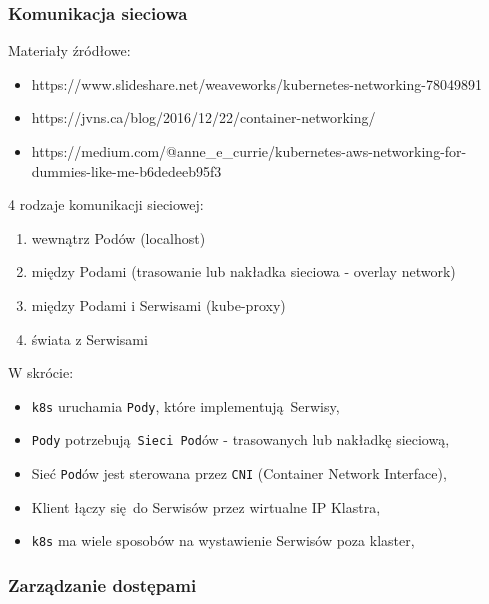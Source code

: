 \documentclass[a4paper,12pt,twoside,openany]{report}
\providecommand{\tightlist}{%
  \setlength{\itemsep}{0pt}\setlength{\parskip}{0pt}}
\newcommand{\passthrough}[1]{#1}
\begin{document}
\hypertarget{komunikacja-sieciowa}{%
\subsubsection{Komunikacja sieciowa}\label{komunikacja-sieciowa}}

Materiały źródłowe:

\begin{itemize}
\tightlist
\item
  https://www.slideshare.net/weaveworks/kubernetes-networking-78049891
\item
  https://jvns.ca/blog/2016/12/22/container-networking/
\item
  https://medium.com/@anne\_e\_currie/kubernetes-aws-networking-for-dummies-like-me-b6dedeeb95f3
\end{itemize}

4 rodzaje komunikacji sieciowej:

\begin{enumerate}
\def\labelenumi{\arabic{enumi}.}
\tightlist
\item
  wewnątrz Podów (localhost)
\item
  między Podami (trasowanie lub nakładka sieciowa - overlay network)
\item
  między Podami i Serwisami (kube-proxy)
\item
  świata z Serwisami
\end{enumerate}

W skrócie:

\begin{itemize}
\tightlist
\item
  \passthrough{\lstinline!k8s!} uruchamia
  \passthrough{\lstinline!Pody!}, które implementują~Serwisy,
\item
  \passthrough{\lstinline!Pody!}
  potrzebują~\passthrough{\lstinline!Sieci Pod!}ów - trasowanych lub
  nakładkę sieciową,
\item
  Sieć \passthrough{\lstinline!Pod!}ów jest sterowana przez
  \passthrough{\lstinline!CNI!} (Container Network Interface),
\item
  Klient łączy się~do Serwisów przez wirtualne IP Klastra,
\item
  \passthrough{\lstinline!k8s!} ma wiele sposobów na wystawienie
  Serwisów poza klaster,
\end{itemize}

\hypertarget{zarzux105dzanie-dostux119pami}{%
\subsubsection{Zarządzanie
dostępami}\label{zarzux105dzanie-dostux119pami}}
\end{document}
